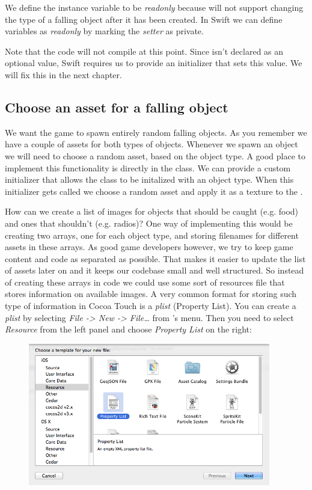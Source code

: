 We define the instance variable to be \textit{readonly} because will not support
changing the type of a falling object after it has been created. In Swift we can 
define variables as \textit{readonly} by marking the \textit{setter} as private.

Note that the code will not compile at this point. Since  isn't
declared as an optional value, Swift requires us to provide an initializer that
sets this value. We will fix this in the next chapter.

\subsection{Choose an asset for a falling object}
We want the game to spawn entirely random falling objects. As you remember we
have a couple of assets for both types of objects. Whenever we spawn an object
we will need to choose a random asset, based on the object type. A good place to
implement this functionality is directly in the 
class. We can provide a custom initializer that allows the class to be initalized with an object type.
When this initializer gets called we choose a random asset and apply it as a
texture to the .

How can we create a list of images for objects that should be caught (e.g.
food) and ones that shouldn't (e.g. radios)? One way of implementing this would
be creating two arrays, one for each object type, and storing filenames for 
different assets in these arrays. As good game developers however, we try to
keep game content and code as separated as possible. That makes it easier to
update the list of assets later on and it keeps our codebase small and well
structured. So instead of creating these arrays in code we could use some sort
of resources file that stores information on available images. A very common 
format for storing such type of information in Cocoa Touch is a \textit{plist} 
(Property List). You can create a \textit{plist} by selecting \textit{File ->
New -> File\ldots} from \xcode{}'s menu. 
Then you need to select \textit{Resource} from the left panel and choose
\textit{Property List} on the right:

\begin{figure}[H]
		\centering
		\includegraphics[width=300pt]{images/Chapter2/create_plist.png}
\end{figure}

